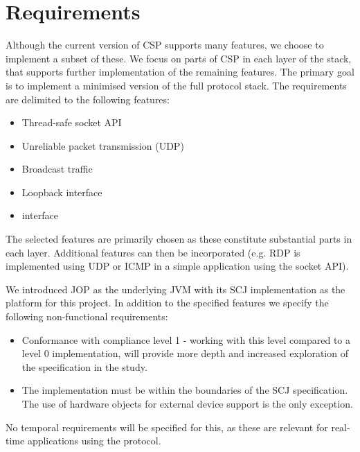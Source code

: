 \section{Requirements}
Although the current version of CSP supports many features, we choose to implement a subset of these. We focus on parts of CSP in each layer of the stack, that supports further implementation of the remaining features. The primary goal is to implement a minimised version of the full protocol stack. The requirements are delimited to the following features:

\begin{itemize}
	\item Thread-safe socket API
	\item Unreliable packet transmission (UDP)
	\item Broadcast traffic
	\item Loopback interface
	\item \iic interface
\end{itemize}

The selected features are primarily chosen as these constitute substantial parts in each layer. Additional features can then be incorporated (e.g. RDP is implemented using UDP or ICMP in a simple application using the socket API). 

We introduced JOP as the underlying JVM with its SCJ implementation as the platform for this project. In addition to the specified features we specify the following non-functional requirements:

\begin{itemize}
	\item Conformance with compliance level 1 - working with this level compared to a level 0 implementation, will provide more depth and increased exploration of the specification in the study.
	\item The implementation must be within the boundaries of the SCJ specification. The use of hardware objects for external device support is the only exception.
\end{itemize}

No temporal requirements will be specified for this, as these are relevant for real-time applications using the protocol.